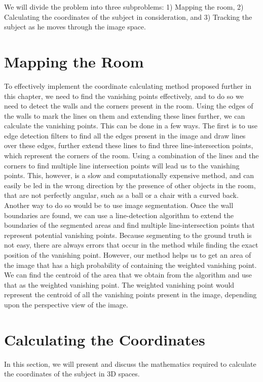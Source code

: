 \documentclass[12pt]{report}
\begin{document}
We will divide the problem into three subproblems: 1) Mapping the room, 2) Calculating the coordinates of the subject in consideration, and 3) Tracking the subject as he moves through the image space.\newline

\section{Mapping the Room}

To effectively implement the coordinate calculating method proposed further in this chapter, we need to find the vanishing points effectively, and to do so we need to detect the walls and the corners present in the room. Using the edges of the walls to mark the lines on them and extending these lines further, we can calculate the vanishing points. This can be done in a few ways. The first is to use edge detection filters to find all the edges present in the image and draw lines over these edges, further extend these lines to find three line-intersection points, which represent the corners of the room. Using a combination of the lines and the corners to find multiple line intersection points will lead us to the vanishing points. This, however, is a slow and computationally expensive method, and can easily be led in the wrong direction by the presence of other objects in the room, that are not perfectly angular, such as a ball or a chair with a curved back. Another way to do so would be to use image segmentation. Once the wall boundaries are found, we can use a line-detection algorithm to extend the boundaries of the segmented areas and find multiple line-intersection points that represent potential vanishing points. Because segmenting to the ground truth is not easy, there are always errors that occur in the method while finding the exact position of the vanishing point. However, our method helps us to get an area of the image that has a high probability of containing the weighted vanishing point. We can find the centroid of the area that we obtain from the algorithm and use that as the weighted vanishing point. The weighted vanishing point would represent the centroid of all the vanishing points present in the image, depending upon the perspective view of the image.

\section{Calculating the Coordinates}

In this section, we will present and discuss the mathematics required to calculate the coordinates of the subject in 3D spaces.\newline
\end{document}
